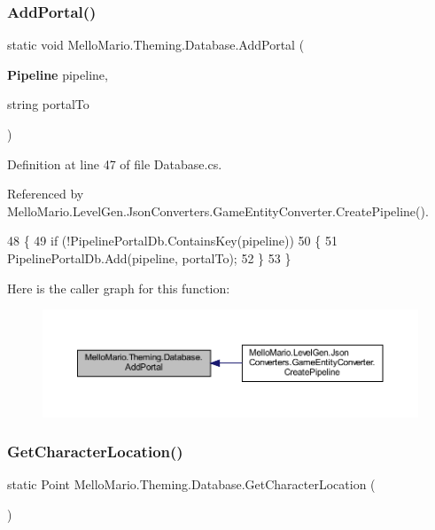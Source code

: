 \subsubsection{Add\+Portal()}
{\footnotesize\ttfamily static void Mello\+Mario.\+Theming.\+Database.\+Add\+Portal (\begin{DoxyParamCaption}\item[{\textbf{ Pipeline}}]{pipeline,  }\item[{string}]{portal\+To }\end{DoxyParamCaption})\hspace{0.3cm}{\ttfamily [static]}}



Definition at line 47 of file Database.\+cs.



Referenced by Mello\+Mario.\+Level\+Gen.\+Json\+Converters.\+Game\+Entity\+Converter.\+Create\+Pipeline().


\begin{DoxyCode}
48         \{
49             \textcolor{keywordflow}{if} (!PipelinePortalDb.ContainsKey(pipeline))
50             \{
51                 PipelinePortalDb.Add(pipeline, portalTo);
52             \}
53         \}
\end{DoxyCode}
Here is the caller graph for this function\+:
\nopagebreak
\begin{figure}[H]
\begin{center}
\leavevmode
\includegraphics[width=350pt]{classMelloMario_1_1Theming_1_1Database_a6f8e0f7198be465c49296ed08ed82cc5_icgraph}
\end{center}
\end{figure}
\mbox{\label{classMelloMario_1_1Theming_1_1Database_ad672d5eb646dd0f4333d2da6868f734b}} 
\subsubsection{Get\+Character\+Location()}
{\footnotesize\ttfamily static Point Mello\+Mario.\+Theming.\+Database.\+Get\+Character\+Location (\begin{DoxyParamCaption}{ }\end{DoxyParamCaption})\hspace{0.3cm}{\ttfamily [static]}}



